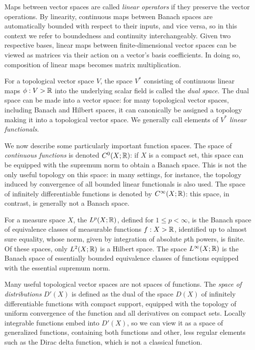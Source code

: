 \documentclass[11pt]{book}
\begin{document}
Maps between vector spaces are called \emph{linear operators} if they preserve the vector operations.
By linearity, continuous maps between Banach spaces are automatically bounded with respect to their inputs, and vice versa, so in this context we refer to boundedness and continuity interchangeably.
Given two respective bases, linear maps between finite-dimensional vector spaces can be viewed as matrices via their action on a vector's basis coefficients.
In doing so, composition of linear maps becomes matrix multiplication.

For a topological vector space $V$, the space $V^*$ consisting of continuous linear maps $\phi : V \-> \mathbb{R}$ into the underlying scalar field is called the \emph{dual space}.
The dual space can be made into a vector space: for many topological vector spaces, including Banach and Hilbert spaces, it can canonically be assigned a topology making it into a topological vector space.
We generally call elements of $V^*$ \emph{linear functionals}.

We now describe some particularly important function spaces.
The space of \emph{continuous functions} is denoted $C^0(X;\mathbb{R})$: if $X$ is a compact set, this space can be equipped with the supremum norm to obtain a Banach space.
This is not the only useful topology on this space: in many settings, for instance, the topology induced by convergence of all bounded linear functionals is also used.
The space of infinitely differentiable functions is denoted by $C^\infty(X;\mathbb{R})$: this space, in contrast, is generally not a Banach space.

For a measure space $X$, the  $L^p(X;\mathbb{R})$, defined for $1 \leq p < \infty$, is the Banach space of equivalence classes of measurable functions $f : X \-> \mathbb{R}$, identified up to almost sure equality, whose norm, given by integration of absolute $p$th powers, is finite.
Of these spaces, only $L^2(X;\mathbb{R})$ is a Hilbert space.
The space $L^\infty(X;\mathbb{R})$ is the Banach space of essentially bounded equivalence classes of functions equipped with the essential supremum norm.

Many useful topological vector spaces are not spaces of functions.
The \emph{space of distributions} $D'(X)$ is defined as the dual of the space $D(X)$ of infinitely differentiable functions with compact support, equipped with the topology of uniform convergence of the function and all derivatives on compact sets.
Locally integrable functions embed into $D'(X)$, so we can view it as a space of generalized functions, containing both functions and other, less regular elements such as the Dirac delta function, which is not a classical function.
\end{document}
